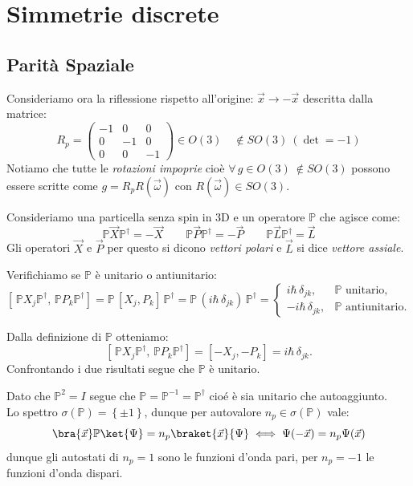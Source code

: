 \section{Simmetrie discrete}
\subsection{Parità Spaziale}
Consideriamo ora la riflessione rispetto all'origine: \(\vec{x}\to -\vec{x}\) descritta dalla matrice:
\[
    R_p = \begin{pmatrix}
        -1&0&0\\0&-1&0\\0&0&-1
    \end{pmatrix}
    \in O(3) \quad \notin SO(3) \ (\det = -1)
\]
Notiamo che tutte le \textit{rotazioni impoprie} cioè \(\forall\, g \in O(3) \ \notin SO(3)\) possono essere scritte come \(g = R_pR(\vec{\omega})\) con \(R(\vec{\omega})\in SO(3)\).

Consideriamo una particella senza spin in 3D e un operatore \(\mathbb{P}\) che agisce come:
\[
    \mathbb{P}\vec{X}\mathbb{P}^\dagger = -\vec{X} \qquad \mathbb{P}\vec{P}\mathbb{P}^\dagger = -\vec{P} \qquad \mathbb{P}\vec{L}\mathbb{P}^\dagger = \vec{L}  
\]
Gli operatori \(\vec{X}\) e \(\vec{P}\) per questo si dicono \textit{vettori polari} e \(\vec{L}\) si dice \textit{vettore assiale}.


Verifichiamo se \(\mathbb{P}\) è unitario o antiunitario:
\begin{equation*}
\left[ \, \mathbb{P} X_j \mathbb{P}^\dagger ,\, \mathbb{P} P_k \mathbb{P}^\dagger \right]
= \mathbb{P}\,[X_j,P_k] \,\mathbb{P}^\dagger
= \mathbb{P}\,(i\hbar\,\delta_{jk})\,\mathbb{P}^\dagger 
= \begin{cases}
 i\hbar\,\delta_{jk}, & \mathbb{P} \text{ unitario},\\
 -i\hbar\,\delta_{jk}, & \mathbb{P} \text{ antiunitario}.
 \end{cases}
\end{equation*}

Dalla definizione di \(\mathbb{P}\) otteniamo:
\[
\left[ \, \mathbb{P} X_j \mathbb{P}^\dagger ,\, \mathbb{P} P_k \mathbb{P}^\dagger \right]
= [-X_j,-P_k] = i\hbar\,\delta_{jk}.
\]
Confrontando i due risultati segue che \(\mathbb{P}\) è unitario.

Dato che \(\mathbb{P}^2 = I\) segue che \(\mathbb{P}= \mathbb{P}^{-1}= \mathbb{P}^\dagger\) cioé è sia unitario che autoaggiunto.\\
Lo spettro \(\sigma(\mathbb{P})= \left\{ \pm 1   \right\}\), dunque per autovalore \(n_p \in \sigma(\mathbb{P})\) vale:
\[
    \bra{\vec{x}}\mathbb{P}\ket{\Psi}= n_p\braket{\vec{x}}{\Psi} \iff \Psi(-\vec{x}) = n_p \Psi(\vec{x})
\]
dunque gli autostati di \(n_p=1\) sono le funzioni d'onda pari, per \(n_p= -1\) le funzioni d'onda dispari.

